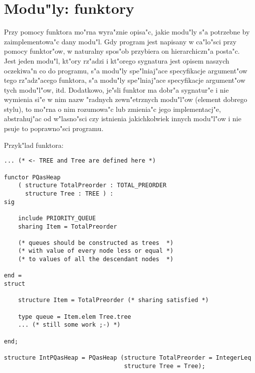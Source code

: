 \chapter{
Modu"ly: funktory
}

Przy pomocy funktora mo"rna wyra"znie opisa"c, jakie modu"ly
s"a potrzebne by zaimplementowa"c dany modu"l. Gdy program jest napisany 
w ca"lo"sci przy pomocy funktor"ow, w naturalny spos"ob przybiera on hierarchiczn"a posta"c.
Jest jeden modu"l, kt"ory rz"adzi i kt"orego sygnatura jest opisem naszych
oczekiwa"n co do programu, s"a modu"ly spe"lniaj"ace specyfikacje argument"ow
tego rz"adz"acego funktora, s"a modu"ly spe"lniaj"ace specyfikacje argument"ow tych modu"l"ow, itd.
Dodatkowo, je"sli funktor ma dobr"a sygnatur"e i nie wymienia si"e w nim nazw "radnych zewn"etrznych
modu"l"ow (element dobrego stylu), to mo"rna o nim rozumowa"c lub zmienia"c
jego implementacj"e, abstrahuj"ac od w"lasno"sci czy istnienia jakichkolwiek innych modu"l"ow
i nie psuje to poprawno"sci programu.  

Przyk"lad funktora:
\begin{verbatim}
... (* <- TREE and Tree are defined here *)   

functor PQasHeap 
    ( structure TotalPreorder : TOTAL_PREORDER
      structure Tree : TREE ) :
sig 

    include PRIORITY_QUEUE
    sharing Item = TotalPreorder

    (* queues should be constructed as trees  *)
    (* with value of every node less or equal *)
    (* to values of all the descendant nodes  *)

end =
struct

    structure Item = TotalPreorder (* sharing satisfied *)

    type queue = Item.elem Tree.tree 
    ... (* still some work ;-) *)

end;

structure IntPQasHeap = PQasHeap (structure TotalPreorder = IntegerLeq 
                                  structure Tree = Tree);
\end{verbatim}

